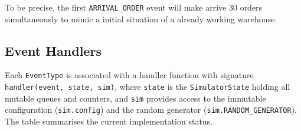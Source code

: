 \documentclass[a4paper,10pt]{article}
\begin{document}
To be precise, the first \texttt{ARRIVAL\_ORDER} event will make arrive $30$ orders simultaneously to mimic a initial situation of a already working warehouse.


\subsection{Event Handlers}

Each \texttt{EventType} is associated with a handler function with signature \texttt{handler(event, state, sim)}, where \texttt{state} is the \texttt{SimulatorState} holding all mutable queues and counters, and \texttt{sim} provides access to the immutable configuration (\texttt{sim.config}) and the random generator (\texttt{sim.RANDOM\_GENERATOR}). The table summarises the current implementation status.
\end{document}
